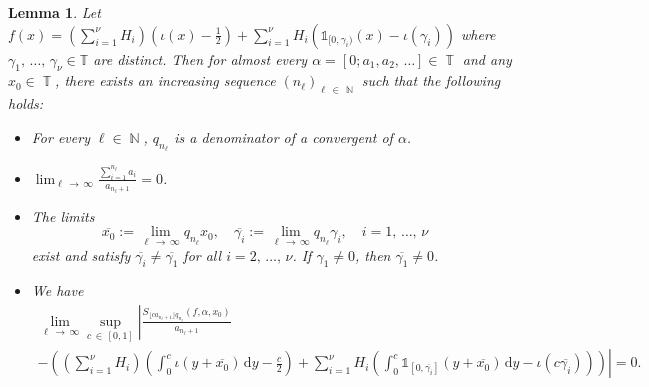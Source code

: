 \documentclass[10pt,a4paper]{amsart}
\numberwithin{equation}{section}
\DeclareMathOperator{\N}{\mathbb{N}}
\DeclareMathOperator{\T}{\mathbb{T}}
\newcommand{\bbT}{\mathbb{T}}
\newcommand{\rmd}{\mathrm{d}}
\newcommand{\kj}{n_{\ell}}
\newtheorem{lemm}[theo]{Lemma}
\theoremstyle{definition}
\begin{document}
\begin{lemm}\label{indicator_lem}
Let $f(x) =(\sum_{i=1}^{\nu} H_i) (\iota(x) - \frac{1}{2}) + \sum_{i=1}^{\nu} H_i (\mathds{1}_{[0, \gamma_i)} (x) - \iota(\gamma_i))$ where $\gamma_1,\,\ldots,\,\gamma_{\nu} \in \bbT$ are distinct. Then for almost every $\alpha = [0;a_1,a_2,\,\ldots] \in \T$ and any $x_0 \in \T$, there exists an increasing sequence $({\kj})_{\ell\,\in\,\N}$ such that the following holds:
\begin{itemize}
\item For every $\ell \in \N$, $q_{\kj}$ is a denominator of a convergent of $\alpha$.
\item $\lim_{\ell\,\to\,\infty} \frac{\sum_{i =1}^{\kj} a_i }{a_{\kj+1}} = 0$.
\item The limits
\[
\overline{x_0} := \lim_{\ell\,\to\,\infty} q_{\kj}x_0, \quad \overline{\gamma_i} := \lim_{\ell\,\to\,\infty} q_{\kj}\gamma_i, \quad i = 1,\,\ldots,\,\nu \quad
\]
exist and satisfy $\overline{\gamma_i} \neq \overline{\gamma_1}$ for all $i = 2,\,\ldots,\,\nu$. If $\gamma_1 \neq 0$, then $\overline{\gamma_1} \neq 0$.
\item We have
\begin{multline}\label{def_of_g}
\lim_{\ell\,\to\,\infty}
\sup_{c\,\in\,[0,1]} \left\vert
\frac{S_{ \lfloor c a_{\kj+1}\rfloor q_{\kj} }(f,\alpha,x_0)}{a_{\kj+1}}\right. \\
-\left. \left(\left(\sum_{i = 1}^{\nu} H_i \right) \left(\int_{0}^{c} \iota(y + \overline{x_0}) \, \rmd y - \frac{c}{2}\right) 
+ \sum_{i = 1}^{\nu} H_i\left(\int_{0}^{c} \mathds{1}_{\left[0, \overline{\gamma_i}\right]}\left(y + \overline{x_0}\right) \,\rmd y - \iota(c\overline{\gamma_i})\right)\right)\right\vert = 0.
\end{multline}
\end{itemize}
\end{lemm}
\end{document}
